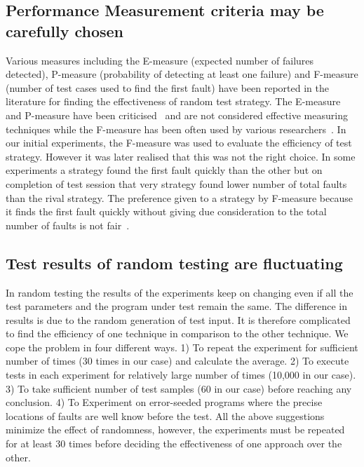  
\subsection{Performance Measurement criteria may be carefully chosen}
Various measures including the E-measure (expected number of failures detected), P-measure (probability of detecting at least one failure) and F-measure (number of test cases used to find the first fault) have been reported in the literature for finding the effectiveness of random test strategy. The E-measure and P-measure have been criticised~\cite{chen2005adaptive} and are not considered effective measuring techniques while the F-measure has been often used by various researchers~\cite{chen2004statistical, chen1996expected}. In our initial experiments, the F-measure was used to evaluate the efficiency of test strategy. However it was later realised that this was not the right choice. In some experiments a strategy found the first fault quickly than the other but on completion of test session that very strategy found lower number of total faults than the rival strategy. The preference given to a strategy by F-measure because it finds the first fault quickly without giving due consideration to the total number of faults is not fair~\cite{liu2012comparison}.

\subsection{Test results of random testing are fluctuating} 
In random testing the results of the experiments keep on changing even if all the test parameters and the program under test remain the same. The difference in results is due to the random generation of test input. It is therefore complicated to find the efficiency of one technique in comparison to the other technique. We cope the problem in four different ways. 1) To repeat the experiment for sufficient number of times (30 times in our case) and calculate the average. 2) To execute tests in each experiment for relatively large number of times (10,000 in our case). 3) To take sufficient number of test samples (60 in our case) before reaching any conclusion. 4) To Experiment on error-seeded programs where the precise locations of faults are well know before the test. All the above suggestions minimize the effect of randomness, however, the experiments must be repeated for at least 30 times before deciding the effectiveness of one approach over the other.

   
